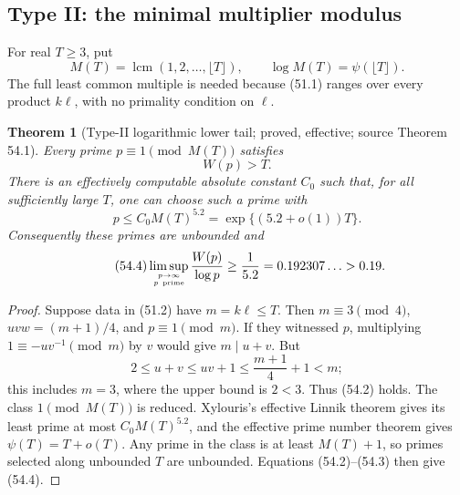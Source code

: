 \documentclass[10pt,reqno]{amsart}
\newtheorem{theorem}{Theorem}[section]
\theoremstyle{definition}
\newcommand{\lcm}{\operatorname {lcm}}
\newcommand{\1}{\mathbf 1}
\begin{document}
\subsection{Type II: the minimal multiplier modulus}
For real $T\geq3$, put
\begin{equation}\tag{54.1}
 M(T)=\lcm(1,2,\ldots,\lfloor T\rfloor),
 \qquad \log M(T)=\psi(\lfloor T\rfloor).
\end{equation}
The full least common multiple is needed because (51.1) ranges over every
product $k\ell$, with no primality condition on $\ell$.

\begin{theorem}[Type-II logarithmic lower tail; proved, effective; source
Theorem 54.1]\label{thm:W-lower}
Every prime $p\equiv1\pmod {M(T)}$ satisfies
\begin{equation}\tag{54.2}
                              W(p)>T.
\end{equation}
There is an effectively computable absolute constant $C_0$ such that, for
all sufficiently large $T$, one can choose such a prime with
\begin{equation}\tag{54.3}
 p\leq C_0M(T)^{5.2}=\exp\{(5.2+o(1))T\}.
\end{equation}
Consequently these primes are unbounded and
\begin{equation}\tag{54.4}
 \limsup_{p\to\infty\atop p\ \mathrm{prime}}\frac{W(p)}{\log p}
 \geq\frac1{5.2}=0.192307\ldots>0.19.
\end{equation}
\end{theorem}
\begin{proof}
Suppose data in (51.2) have $m=k\ell\leq T$.  Then $m\equiv3\pmod4$,
$uvw=(m+1)/4$, and $p\equiv1\pmod m$.  If they witnessed $p$, multiplying
$1\equiv-uv^{-1}\pmod m$ by $v$ would give $m\mid u+v$.  But
\[
 2\leq u+v\leq uv+1\leq\frac{m+1}{4}+1<m;
\]
this includes $m=3$, where the upper bound is $2<3$.  Thus (54.2) holds.
The class $1\pmod {M(T)}$ is reduced.  Xylouris's effective Linnik theorem
\cite{Xylouris} gives its least prime at most $C_0M(T)^{5.2}$, and the
effective prime number theorem gives $\psi(T)=T+o(T)$.  Any prime in the
class is at least $M(T)+1$, so primes selected along unbounded $T$ are
unbounded.  Equations (54.2)--(54.3) then give (54.4).
\end{proof}
\end{document}
